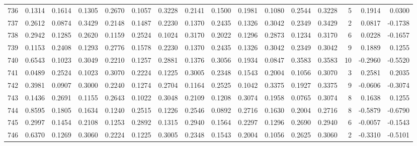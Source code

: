 \begin{tabular}{lrrrrrrrrrrrrrrr}
736 &      0.1314 &  0.1614 &  0.1305 &  0.2670 &  0.1057 &  0.3228 &  0.2141 &  0.1500 &  0.1981 &  0.1080 &   0.2544 &     0.3228 &      5 &                    0.1914 &                     0.0300 \\
737 &      0.2612 &  0.0874 &  0.3429 &  0.2148 &  0.1487 &  0.2230 &  0.1370 &  0.2435 &  0.1326 &  0.3042 &   0.2349 &     0.3429 &      2 &                    0.0817 &                    -0.1738 \\
738 &      0.2942 &  0.1285 &  0.2620 &  0.1159 &  0.2524 &  0.1024 &  0.3170 &  0.2022 &  0.1296 &  0.2873 &   0.1234 &     0.3170 &      6 &                    0.0228 &                    -0.1657 \\
739 &      0.1153 &  0.2408 &  0.1293 &  0.2776 &  0.1578 &  0.2230 &  0.1370 &  0.2435 &  0.1326 &  0.3042 &   0.2349 &     0.3042 &      9 &                    0.1889 &                     0.1255 \\
740 &      0.6543 &  0.1023 &  0.3049 &  0.2210 &  0.1257 &  0.2881 &  0.1376 &  0.3056 &  0.1934 &  0.0847 &   0.3583 &     0.3583 &     10 &                   -0.2960 &                    -0.5520 \\
741 &      0.0489 &  0.2524 &  0.1023 &  0.3070 &  0.2224 &  0.1225 &  0.3005 &  0.2348 &  0.1543 &  0.2004 &   0.1056 &     0.3070 &      3 &                    0.2581 &                     0.2035 \\
742 &      0.3981 &  0.0907 &  0.3000 &  0.2240 &  0.1274 &  0.2704 &  0.1164 &  0.2525 &  0.1042 &  0.3375 &   0.1927 &     0.3375 &      9 &                   -0.0606 &                    -0.3074 \\
743 &      0.1436 &  0.2691 &  0.1155 &  0.2643 &  0.1022 &  0.3048 &  0.2109 &  0.1208 &  0.3074 &  0.1958 &   0.0765 &     0.3074 &      8 &                    0.1638 &                     0.1255 \\
744 &      0.8595 &  0.1805 &  0.1634 &  0.1240 &  0.2515 &  0.1226 &  0.2546 &  0.0892 &  0.2716 &  0.1630 &   0.2004 &     0.2716 &      8 &                   -0.5879 &                    -0.6790 \\
745 &      0.2997 &  0.1454 &  0.2108 &  0.1253 &  0.2892 &  0.1315 &  0.2940 &  0.1564 &  0.2297 &  0.1296 &   0.2690 &     0.2940 &      6 &                   -0.0057 &                    -0.1543 \\
746 &      0.6370 &  0.1269 &  0.3060 &  0.2224 &  0.1225 &  0.3005 &  0.2348 &  0.1543 &  0.2004 &  0.1056 &   0.2625 &     0.3060 &      2 &                   -0.3310 &                    -0.5101 \\

\end{tabular}
